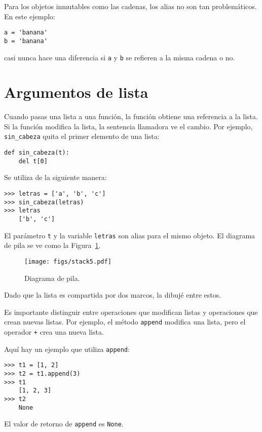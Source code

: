\documentclass[10pt]{book}
\begin{document}
Para los objetos inmutables como las cadenas, los alias no son tan
problemáticos.  En este ejemplo:

\begin{verbatim}
a = 'banana'
b = 'banana'
\end{verbatim}
%
casi nunca hace una diferencia si {\tt a} y {\tt b} se refieren
a la misma cadena o no.


\section{Argumentos de lista}
\label{list.arguments}

Cuando pasas una lista a una función, la función obtiene una referencia a
la lista.  Si la función modifica la lista, la sentencia llamadora ve
el cambio.  Por ejemplo, \verb"sin_cabeza" quita el primer elemento
de una lista:

\begin{verbatim}
def sin_cabeza(t):
    del t[0]
\end{verbatim}
%
Se utiliza de la siguiente manera:

\begin{verbatim}
>>> letras = ['a', 'b', 'c']
>>> sin_cabeza(letras)
>>> letras
    ['b', 'c']
\end{verbatim}
%
El parámetro {\tt t} y la variable {\tt letras} son
alias para el mismo objeto.  El diagrama de pila se ve como la
Figura~\ref{fig.stack5}.

\begin{figure}
\centerline
{\texttt{[image: figs/stack5.pdf]}}
\caption{Diagrama de pila.}
\label{fig.stack5}
\end{figure}

Dado que la lista es compartida por dos marcos, la dibujé
entre estos.

Es importante distinguir entre operaciones que
modifican listas y operaciones que crean nuevas listas.  Por
ejemplo, el método {\tt append} modifica una lista, pero el
operador {\tt +} crea una nueva lista.

Aquí hay un ejemplo que utiliza {\tt append}:
%
\begin{verbatim}
>>> t1 = [1, 2]
>>> t2 = t1.append(3)
>>> t1
    [1, 2, 3]
>>> t2
    None
\end{verbatim}
%
El valor de retorno de {\tt append} es {\tt None}.
\end{document}
